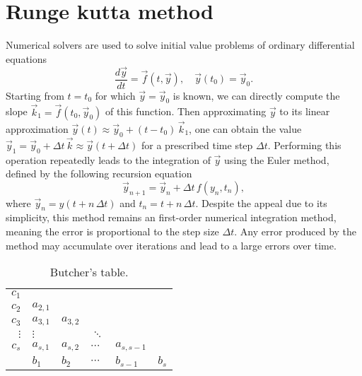 \chapter{Runge kutta method}\label{app:runge_kutta_method}

Numerical solvers are used to solve initial value problems of ordinary differential equations
\begin{equation}
	\frac{d \vec{y}}{dt} = \vec{f}(t, \vec{y}), \quad \vec{y}(t_0) = \vec{y}_0.
\end{equation}
Starting from $t = t_0$ for which $\vec{y} = \vec{y}_0$ is known, we can directly compute the slope $\vec{k}_1 = \vec{f}(t_0, \vec{y}_0)$ of this function.
Then approximating $\vec{y}$ to its linear approximation $\vec{y}(t) \approx \vec{y}_0 + (t - t_0) \, \vec{k}_1$, one can obtain the value $\vec{y}_1 = \vec{y}_0 + \varDelta t \, \vec{k} \approx \vec{y}(t + \varDelta t)$ for a prescribed time step $\varDelta t$.
Performing this operation repeatedly leads to the integration of $\vec{y}$ using the Euler method, defined by the following recursion equation
\begin{equation}
	\vec{y}_{n+1} = \vec{y}_n + \varDelta t \, f(y_n, t_n),
\end{equation}
where $\vec{y}_n = y(t + n \, \varDelta t)$ and $t_n = t + n \, \varDelta t$.
Despite the appeal due to its simplicity, this method remains an first-order numerical integration method, meaning the error is proportional to the step size $\varDelta t$.
Any error produced by the method may accumulate over iterations and lead to a large errors over time.
\begin{wraptable}[9]{L}[0.5\width]{0.45\textwidth}
	\vspace{-10pt}
	\center
	\begin{tabular}{ r | l l l l l }
		$c_1$ & & & & & \\
		$c_2$ & $a_{2,1}$ & & & & \\
		$c_3$ & $a_{3,1}$ & $a_{3,2}$ & & & \\
		$\vdots$ & $\vdots$ & & $\ddots$ & & \\
		$c_s$ & $a_{s,1}$ & $a_{s,2}$ & $\cdots$ & $a_{s,s-1}$ & \\
		\midrule
		 & $b_1$ & $b_2$ & $\cdots$ & $b_{s-1}$ & $b_s$
	\end{tabular}
	\captionsetup{width=0.4\textwidth}

	\caption{
		Butcher's table.
	}
	\label{tab:butcher_table}
\end{wraptable}

